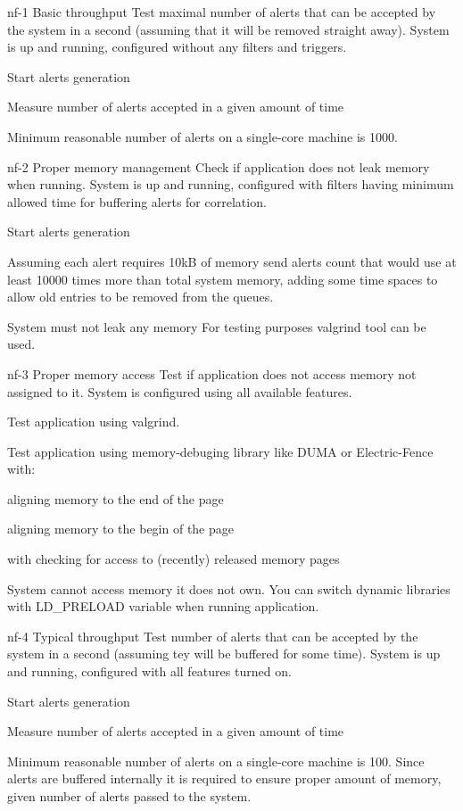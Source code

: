 \testCase
{nf-1}
{Basic throughput}
{Test maximal number of alerts that can be accepted by the system in a second (assuming that it will be removed straight away).}
{System is up and running, configured without any filters and triggers.}
{
\begin{enumerate*}
\item{Start alerts generation}
\item{Measure number of alerts accepted in a given amount of time}
\end{enumerate*}
}
{Minimum reasonable number of alerts on a single-core machine is 1000.}
{}


\testCase
{nf-2}
{Proper memory management}
{Check if application does not leak memory when running.}
{System is up and running, configured with filters having minimum allowed time for buffering alerts for correlation.}
{
\begin{enumerate*}
\item{Start alerts generation}
\item{Assuming each alert requires 10kB of memory send alerts count that would use at least 10000 times more than total system memory, adding some time spaces to allow old entries to be removed from the queues.}
\end{enumerate*}
}
{System must not leak any memory}
{For testing purposes valgrind tool can be used.}


\testCase
{nf-3}
{Proper memory access}
{Test if application does not access memory not assigned to it.}
{System is configured using all available features.}
{
\begin{enumerate*}
\item{Test application using valgrind.}
\item{Test application using memory-debuging library like DUMA or Electric-Fence with:}
  \begin{enumerate*}
  \item aligning memory to the end of the page
  \item aligning memory to the begin of the page
  \item with checking for access to (recently) released memory pages
  \end{enumerate*}
\end{enumerate*}
}
{System cannot access memory it does not own.}
{You can switch dynamic libraries with LD\_PRELOAD variable when running application.}


\testCase
{nf-4}
{Typical throughput}
{Test number of alerts that can be accepted by the system in a second (assuming tey will be buffered for some time).}
{System is up and running, configured with all features turned on.}
{
\begin{enumerate*}
\item{Start alerts generation}
\item{Measure number of alerts accepted in a given amount of time}
\end{enumerate*}
}
{Minimum reasonable number of alerts on a single-core machine is 100.}
{Since alerts are buffered internally it is required to ensure proper amount of memory, given number of alerts passed to the system.}
